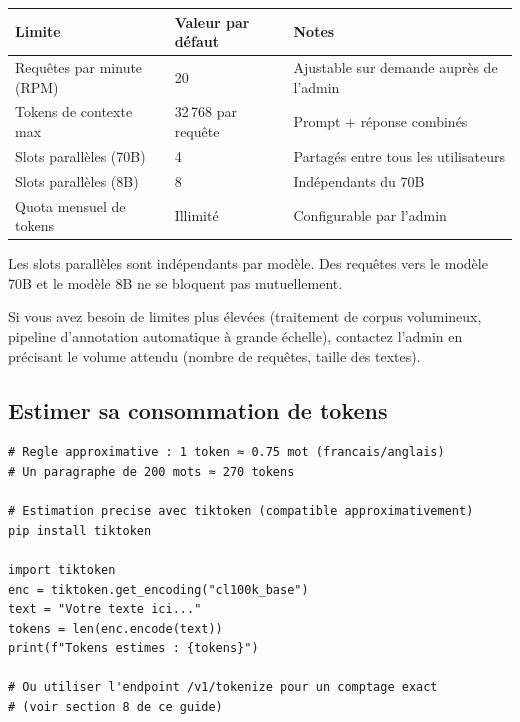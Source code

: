 \documentclass[12pt, a4paper, twoside]{article}
\begin{document}
\begin{center}
\begin{tabular}{L{5cm} C{3cm} L{5cm}}
  \toprule
  \textbf{Limite} & \textbf{Valeur par défaut} & \textbf{Notes} \\
  \midrule
  Requêtes par minute (RPM) & 20 & Ajustable sur demande auprès de l'admin \\
  Tokens de contexte max    & 32\,768 par requête & Prompt + réponse combinés \\
  Slots parallèles (70B)    & 4 & Partagés entre tous les utilisateurs \\
  Slots parallèles (8B)     & 8 & Indépendants du 70B \\
  Quota mensuel de tokens   & Illimité & Configurable par l'admin \\
  \bottomrule
\end{tabular}
\end{center}

\begin{important}
  Les slots parallèles sont indépendants par modèle. Des requêtes vers le modèle 70B et
  le modèle 8B ne se bloquent pas mutuellement.
\end{important}

Si vous avez besoin de limites plus élevées (traitement de corpus volumineux, pipeline
d'annotation automatique à grande échelle), contactez l'admin en précisant le volume
attendu (nombre de requêtes, taille des textes).

\subsection{Estimer sa consommation de tokens}

\begin{lstlisting}[style=pythonstyle, caption={Estimation du nombre de tokens avec tiktoken}]
# Regle approximative : 1 token ≈ 0.75 mot (francais/anglais)
# Un paragraphe de 200 mots ≈ 270 tokens

# Estimation precise avec tiktoken (compatible approximativement)
pip install tiktoken

import tiktoken
enc = tiktoken.get_encoding("cl100k_base")
text = "Votre texte ici..."
tokens = len(enc.encode(text))
print(f"Tokens estimes : {tokens}")

# Ou utiliser l'endpoint /v1/tokenize pour un comptage exact
# (voir section 8 de ce guide)
\end{lstlisting}

\end{document}
